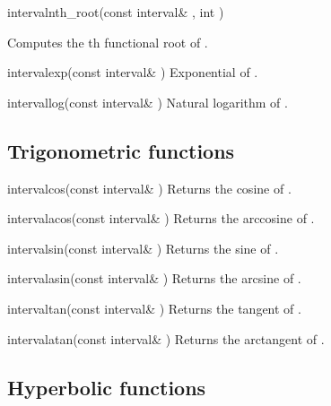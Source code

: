 \documentclass{manual}
\begin{document}
\begin{deffun}{interval}{nth\_root}{(const interval\& , int )}
  \begin{operation}
  \end{operation}
  Computes the th functional root of .
\end{deffun}


\begin{deffun}{interval}{exp}{(const interval\& )}
  Exponential of .
\end{deffun}

\begin{deffun}{interval}{log}{(const interval\& )}
  Natural logarithm of .
\end{deffun}

\subsection{Trigonometric functions}

\begin{deffun}{interval}{cos}{(const interval\& )}
  Returns the cosine of .
\end{deffun}

\begin{deffun}{interval}{acos}{(const interval\& )}
  Returns the arccosine of .
\end{deffun}

\begin{deffun}{interval}{sin}{(const interval\& )}
  Returns the sine of .
\end{deffun}

\begin{deffun}{interval}{asin}{(const interval\& )}
  Returns the arcsine of .
\end{deffun}

\begin{deffun}{interval}{tan}{(const interval\& )}
  Returns the tangent of .
\end{deffun}

\begin{deffun}{interval}{atan}{(const interval\& )}
  Returns the arctangent of .
\end{deffun}

\subsection{Hyperbolic functions}
\end{document}

